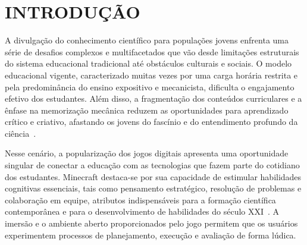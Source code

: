 %
%

\newpage

\chapter{INTRODUÇÃO}

A divulgação do conhecimento científico para populações jovens enfrenta uma série de desafios complexos e multifacetados que vão desde limitações estruturais do sistema educacional tradicional até obstáculos culturais e sociais. O modelo educacional vigente, caracterizado muitas vezes por uma carga horária restrita e pela predominância do ensino expositivo e mecanicista, dificulta o engajamento efetivo dos estudantes. Além disso, a fragmentação dos conteúdos curriculares e a ênfase na memorização mecânica reduzem as oportunidades para aprendizado crítico e criativo, afastando os jovens do fascínio e do entendimento profundo da ciência~\cite{uol2024}.

Nesse cenário, a popularização dos jogos digitais apresenta uma oportunidade singular de conectar a educação com as tecnologias que fazem parte do cotidiano dos estudantes. Minecraft destaca-se por sua capacidade de estimular habilidades cognitivas essenciais, tais como pensamento estratégico, resolução de problemas e colaboração em equipe, atributos indispensáveis para a formação científica contemporânea e para o desenvolvimento de habilidades do século XXI~\cite{newzoo2024}. A imersão e o ambiente aberto proporcionados pelo jogo permitem que os usuários experimentem processos de planejamento, execução e avaliação de forma lúdica.

